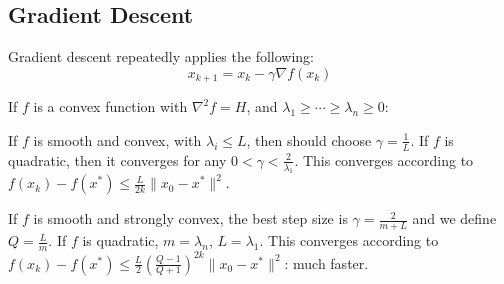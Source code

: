 \documentclass[10pt]{extarticle}
\begin{document}
\begin{multicols*}{2}
\section{Gradient Descent}
Gradient descent repeatedly applies the following:
\[ x_{k + 1} = x_k - \gamma \nabla f(x_k) \]

If $f$ is a convex function with $\nabla^2 f = H$, and $\lambda_1 \geq \cdots \geq \lambda_n \geq 0$:
\begin{compactitem}
\item If $f$ is smooth and convex, with $\lambda_i \leq L$, then should choose $\gamma = \frac{1}{L}$. If $f$ is quadratic, then it converges for any $0 < \gamma < \frac{2}{\lambda_1}$.
	This converges according to $f(x_k) - f(x^*) \leq \frac{L}{2k}\|x_0 - x^*\|^2$.
\item If $f$ is smooth and strongly convex, the best step size is $\gamma = \frac{2}{m + L}$ and we define $Q = \frac{L}{m}$. If $f$ is quadratic, $m = \lambda_n$, $L = \lambda_1$.
	This converges according to $f(x_k) - f(x^*) \leq \frac{L}{2} \left(\frac{Q - 1}{Q + 1}\right)^{2k} \|x_0 - x^*\|^2$: much faster.
\end{compactitem}


\end{multicols*}
\end{document}
